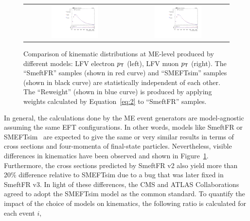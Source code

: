\begin{figure}[tbh!]
 \begin{center}
 \begin{tabular}{cc}
 \includegraphics[width=0.48\textwidth]{figures/Part3/Samples/LFVePt}&
 \includegraphics[width=0.48\textwidth]{figures/Part3/Samples/LFVmuPt}\\
 \end{tabular}
 \caption{Comparison of kinematic distributions at \ac{ME}-level produced by different models: LFV electron $p_{\textsf{T}}$ (left), LFV muon $p_{\textsf{T}}$ (right). The ``SmeftFR'' samples (shown in red curve) and ``SMEFTsim'' samples (shown in black curve) are statistically independent of each other. The ``Reweight'' (shown in blue curve) is produced by applying weights calculated by Equation~\ref{eq:2} to ``SmeftFR'' samples.}
 \label{fig:reweight}
 \end{center}
\end{figure}

In general, the calculations done by the \ac{ME} event generators are model-agnostic assuming the same \ac{EFT} configurations. In other words, models like SmeftFR or SMEFTsim~\cite{Brivio:2017btx} are expected to give the same or very similar results in terms of cross sections and four-momenta of final-state particles. Nevertheless, visible differences in kinematics have been observed and shown in Figure~\ref{fig:reweight}. Furthermore, the cross sections predicted by SmeftFR v2 also yield more than 20\% difference relative to SMEFTsim due to a bug that was later fixed in SmeftFR v3. In light of these differences, the \ac{CMS} and \ac{ATLAS} Collaborations agreed to adopt the SMEFTsim model as the common standard. To quantify the impact of the choice of models on kinematics, the following ratio is calculated for each event $i$,

